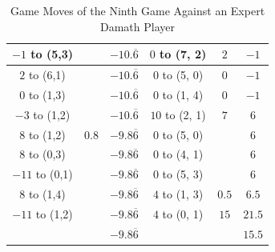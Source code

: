 \begin{appendices}
\begin{table}[H]
\begin{tabular}{cccccc}
          $-1$ to (5,3)  &                &  $-10.\overline6$ &   $0$ to (7, 2) & $2$        &  $-1$    \\ \hline
          $2$ to (6,1)  &                &  $-10.\overline6$ &   $0$ to (5, 0) & $0$        &  $-1$    \\ \hline
          $0$ to (1,3)  &                &  $-10.\overline6$ &   $0$ to (1, 4) & $0$        &  $-1$    \\ \hline
          $-3$ to (1,2)  &                &  $-10.\overline6$ &   $10$ to (2, 1) & $7$        &  $6$    \\ \hline
          $8$ to (1,2)  & $0.8$           &  $-9.8\overline6$ &   $0$ to (5, 0) &            &  $6$    \\ \hline
          $8$ to (0,3)  &                 &  $-9.8\overline6$ &   $0$ to (4, 1) &            &  $6$    \\ \hline
          $-11$ to (0,1)  &               &  $-9.8\overline6$ &   $0$ to (5, 3) &            &  $6$    \\ \hline
          $8$ to (1,4)  &                  &  $-9.8\overline6$ &   $4$ to (1, 3) & $0.5$      &  $6.5$    \\ \hline
          $-11$ to (1,2)  &                &  $-9.8\overline6$ &   $4$ to (0, 1) & $15$      &  $21.5$    \\ \hline \hline
                          &                &  $-9.8\overline6$ &                 &           &  $15.5$    \\ \hline \hline
    \end{tabular}
    \caption{Game Moves of the Ninth Game Against an Expert Damath Player}
    \label{tab:ninth-game}
\end{table}


\end{appendices}
